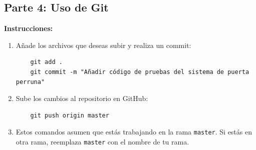 \subsection*{Parte 4: Uso de Git}
\textbf{Instrucciones:}
\begin{enumerate}
    \item Añade los archivos que deseas subir y realiza un commit:
    \begin{verbatim}
    git add .
    git commit -m "Añadir código de pruebas del sistema de puerta perruna"
    \end{verbatim}
    
    \item Sube los cambios al repositorio en GitHub:
    \begin{verbatim}
    git push origin master
    \end{verbatim}
    
    \item Estos comandos asumen que estás trabajando en la rama \texttt{master}. Si estás en otra rama, reemplaza \texttt{master} con el nombre de tu rama.
\end{enumerate}

